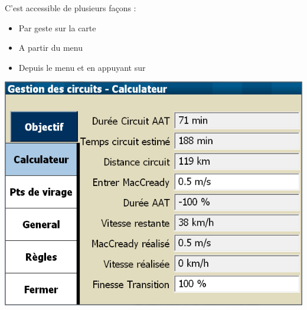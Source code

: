C'est accessible de plusieurs façons : 
\begin{itemize}
\item Par geste sur la carte
\item A partir du menu 
\begin{quote}
\blink{}
\end{quote}
\item Depuis le menu \blink{} et en appuyant sur 
\end{itemize}

\begin{center}
\includegraphics[angle=0,width=0.8\linewidth,keepaspectratio='true']{figures/dialog-taskcalc3.png}
\end{center}

